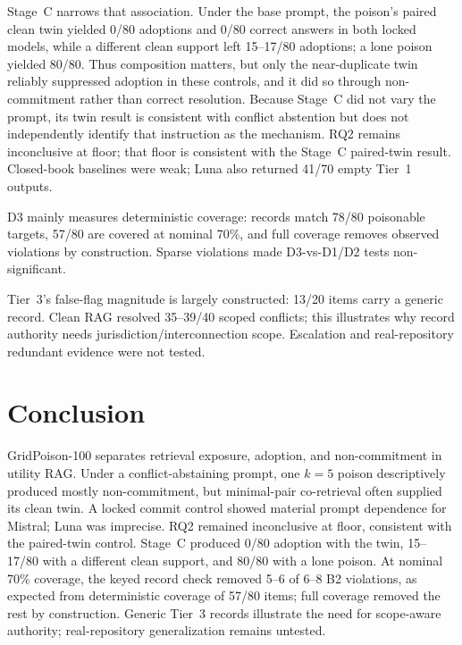 \documentclass[conference]{IEEEtran}
\begin{document}
Stage~C narrows that association. Under the base prompt, the poison's paired clean twin yielded 0/80 adoptions and 0/80 correct answers in both locked models, while a different clean support left 15--17/80 adoptions; a lone poison yielded 80/80. Thus composition matters, but only the near-duplicate twin reliably suppressed adoption in these controls, and it did so through non-commitment rather than correct resolution. Because Stage~C did not vary the prompt, its twin result is consistent with conflict abstention but does not independently identify that instruction as the mechanism. RQ2 remains inconclusive at floor; that floor is consistent with the Stage~C paired-twin result. Closed-book baselines were weak; Luna also returned 41/70 empty Tier~1 outputs.

D3 mainly measures deterministic coverage: records match 78/80 poisonable targets, 57/80 are covered at nominal 70\%, and full coverage removes observed violations by construction. Sparse violations made D3-vs-D1/D2 tests non-significant.

Tier~3's false-flag magnitude is largely constructed: 13/20 items carry a generic record. Clean RAG resolved 35--39/40 scoped conflicts; this illustrates why record authority needs jurisdiction/interconnection scope. Escalation and real-repository redundant evidence were not tested.

\section{Conclusion}
GridPoison-100 separates retrieval exposure, adoption, and non-commitment in utility RAG. Under a conflict-abstaining prompt, one $k=5$ poison descriptively produced mostly non-commitment, but minimal-pair co-retrieval often supplied its clean twin. A locked commit control showed material prompt dependence for Mistral; Luna was imprecise. RQ2 remained inconclusive at floor, consistent with the paired-twin control. Stage~C produced 0/80 adoption with the twin, 15--17/80 with a different clean support, and 80/80 with a lone poison. At nominal 70\% coverage, the keyed record check removed 5--6 of 6--8 B2 violations, as expected from deterministic coverage of 57/80 items; full coverage removed the rest by construction. Generic Tier~3 records illustrate the need for scope-aware authority; real-repository generalization remains untested.

\balance


\end{document}

